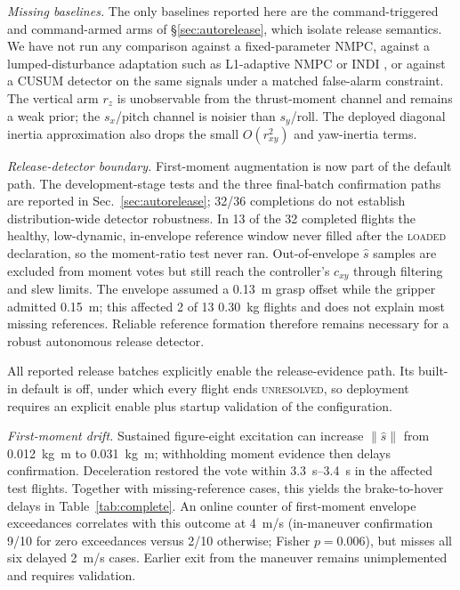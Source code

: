 \documentclass[conference]{IEEEtran}
\begin{document}
\emph{Missing baselines.} The only baselines reported here are the command-triggered and
command-armed arms of \S\ref{sec:autorelease}, which isolate release semantics. We have not run
any comparison against a fixed-parameter NMPC, against a lumped-disturbance adaptation such as
L1-adaptive NMPC \cite{hanover2021} or INDI \cite{smeur}, or against a CUSUM detector
\cite{basseville1993} on the same signals under a matched false-alarm constraint. The vertical arm $r_z$ is unobservable from the
thrust-moment channel and remains a weak prior; the $s_x$/pitch channel is noisier than
$s_y$/roll. The deployed diagonal inertia approximation also drops the small
$O(r_{xy}^{2})$ and yaw-inertia terms.

\emph{Release-detector boundary.} First-moment augmentation is now part of the default path.
The development-stage tests and the three final-batch confirmation paths are reported in
Sec.~\ref{sec:autorelease}; 32/36 completions do not establish distribution-wide detector
robustness. In 13 of the 32 completed flights the healthy, low-dynamic, in-envelope reference
window never filled after the \textsc{loaded} declaration, so the moment-ratio test never ran.
Out-of-envelope $\hat s$ samples are excluded from moment votes but still reach the
controller's $c_{xy}$ through filtering and slew limits. The envelope assumed a
\SI{0.13}{m} grasp offset while the gripper admitted \SI{0.15}{m}; this affected 2 of 13
\SI{0.30}{kg} flights and does not explain most missing references. Reliable reference formation
therefore remains necessary for a robust autonomous release detector.

All reported release batches explicitly enable the release-evidence path. Its built-in
default is off, under which every flight ends \textsc{unresolved}, so deployment requires an
explicit enable plus startup validation of the configuration.

\emph{First-moment drift.} Sustained figure-eight excitation can increase
$\lVert\hat s\rVert$ from \SI{0.012}{\kilo\gram\metre} to
\SI{0.031}{\kilo\gram\metre}; withholding moment evidence then delays confirmation.
Deceleration restored the vote within \SIrange{3.3}{3.4}{s} in the affected test flights.
Together with missing-reference cases, this yields the brake-to-hover delays in
Table~\ref{tab:complete}. An online counter of first-moment envelope exceedances correlates
with this outcome at \SI{4}{m/s} (in-maneuver confirmation 9/10 for zero exceedances
versus 2/10 otherwise; Fisher $p=0.006$), but misses all six delayed \SI{2}{m/s} cases.
Earlier exit from the maneuver remains unimplemented
and requires validation.
\end{document}

